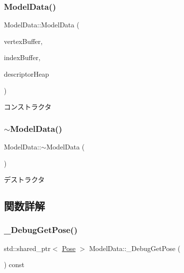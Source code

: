 \subsubsection{\texorpdfstring{Model\+Data()}{ModelData()}}
{\footnotesize\ttfamily Model\+Data\+::\+Model\+Data (\begin{DoxyParamCaption}\item[{std\+::shared\+\_\+ptr$<$ \mbox{\hyperlink{class_vertex_buffer}{Vertex\+Buffer}} $>$}]{vertex\+Buffer,  }\item[{std\+::shared\+\_\+ptr$<$ \mbox{\hyperlink{class_index_buffer}{Index\+Buffer}} $>$}]{index\+Buffer,  }\item[{std\+::shared\+\_\+ptr$<$ \mbox{\hyperlink{class_descriptor_heap}{Descriptor\+Heap}} $>$}]{descriptor\+Heap }\end{DoxyParamCaption})}



コンストラクタ 

\mbox{\label{class_model_data_a8888ea03c5d27446f2f7f93f6fe6cd42}} 
\subsubsection{\texorpdfstring{$\sim$\+Model\+Data()}{~ModelData()}}
{\footnotesize\ttfamily Model\+Data\+::$\sim$\+Model\+Data (\begin{DoxyParamCaption}{ }\end{DoxyParamCaption})\hspace{0.3cm}{\ttfamily [virtual]}}



デストラクタ 



\subsection{関数詳解}
\mbox{\label{class_model_data_a7c43dc81e963e445250c2ae8aceae9d0}} 
\subsubsection{\texorpdfstring{\+\_\+\+Debug\+Get\+Pose()}{\_DebugGetPose()}}
{\footnotesize\ttfamily std\+::shared\+\_\+ptr$<$ \mbox{\hyperlink{class_pose}{Pose}} $>$ Model\+Data\+::\+\_\+\+Debug\+Get\+Pose (\begin{DoxyParamCaption}{ }\end{DoxyParamCaption}) const}

